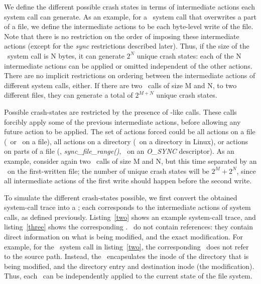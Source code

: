We define the different possible crash states in terms of intermediate actions each system call can generate. As an example, for a \writeSC\ system call that overwrites a part of a file, we define the intermediate actions to be each byte-level write of the file. Note that there is no restriction on the order of imposing these intermediate actions (except for the {\it sync} restrictions described later). Thus, if the size of the \writeSC\ system call is N bytes, it can generate $2^{N}$ unique crash states: each of the N intermediate actions can be applied or omitted independent of the other actions. There are no implicit restrictions on ordering between the intermediate actions of different system calls, either. If there are two \writeSC\ calls of size M and N, to two different files, they can generate a total of $2^{M + N}$ unique crash states.

Possible crash-states are restricted by the presence of \fsyncSC-like calls. These calls forcibly apply some of the previous intermediate actions, before allowing any future action to be applied. The set of actions forced could be all actions on a file (\fsyncSC\ or \fdatasyncSC\ on a file), all actions on a directory (\fsyncSC\ on a directory in Linux), or actions on parts of a file (\msyncSC, {\it sync\_file\_range()}, \writeSC\ on an {\it O\_SYNC} descriptor). As an example, consider again two \writeSC\ calls of size M and N, but this time separated by an \fsyncSC\ on the first-written file; the number of unique crash states will be $2^M + 2^N$, since all intermediate actions of the first write should happen before the second write.

To simulate the different crash-states possible, we first convert the obtained system-call trace into a {\it \microprogram}; each {\it \microinstruction} corresponds to the intermediate actions of system calls, as defined previously. Listing~\ref{two} shows an example system-call trace, and listing~\ref{three} shows the corresponding \microprogram. \Microinstructions\ do not contain references: they contain direct information on what is being modified, and the exact modification. For example, for the \linkSC\ system call in listing~\ref{two}, the corresponding \microinstruction\ does not refer to the source path. Instead, the \microinstruction\ encapsulates the inode of the directory that is being modified, and the directory entry and destination inode (the modification). Thus, each \microinstruction\ can be independently applied to the current state of the file system.

